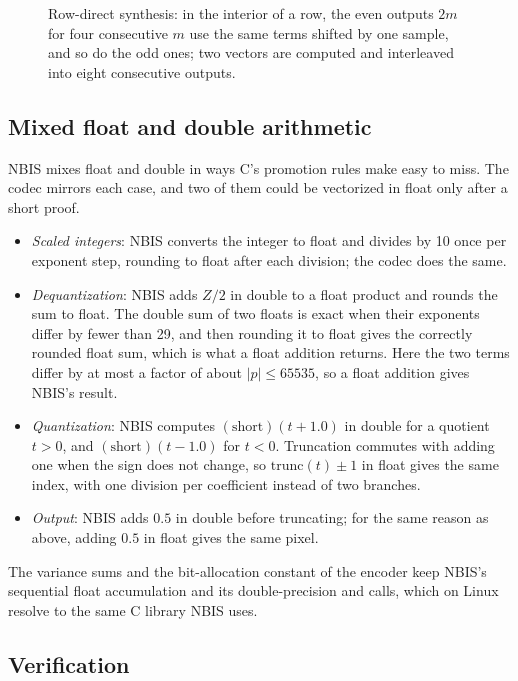 \begin{figure}[ht]
  \centering
  
  \caption{Row-direct synthesis: in the interior of a row, the even outputs $2m$ for four
  consecutive $m$ use the same terms shifted by one sample, and so do the odd ones; two vectors
  are computed and interleaved into eight consecutive outputs.}
  \label{fig:rowdirect}
\end{figure}

\subsection{Mixed float and double arithmetic}

NBIS mixes float and double in ways C's promotion rules make easy to miss. The codec mirrors
each case, and two of them could be vectorized in float only after a short proof.
\begin{itemize}
  \item \emph{Scaled integers}: NBIS converts the integer to float and divides by 10 once per
    exponent step, rounding to float after each division; the codec does the same.
  \item \emph{Dequantization}: NBIS adds $Z/2$ in double to a float product and rounds the sum to
    float. The double sum of two floats is exact when their exponents differ by fewer than 29,
    and then rounding it to float gives the correctly rounded float sum, which is what a float
    addition returns. Here the two terms differ by at most a factor of about $|p| \le 65535$, so
    a float addition gives NBIS's result.
  \item \emph{Quantization}: NBIS computes $(\text{short})(t + 1.0)$ in double for a quotient
    $t > 0$, and $(\text{short})(t - 1.0)$ for $t < 0$. Truncation commutes with adding one when the
    sign does not change, so $\mathrm{trunc}(t) \pm 1$ in float gives the same index, with one
    division per coefficient instead of two branches.
  \item \emph{Output}: NBIS adds $0.5$ in double before truncating; for the same reason as above,
    adding $0.5$ in float gives the same pixel.
\end{itemize}
The variance sums and the bit-allocation constant of the encoder keep NBIS's sequential float
accumulation and its double-precision  and  calls, which on Linux resolve to
the same C library NBIS uses.

\subsection{Verification}

